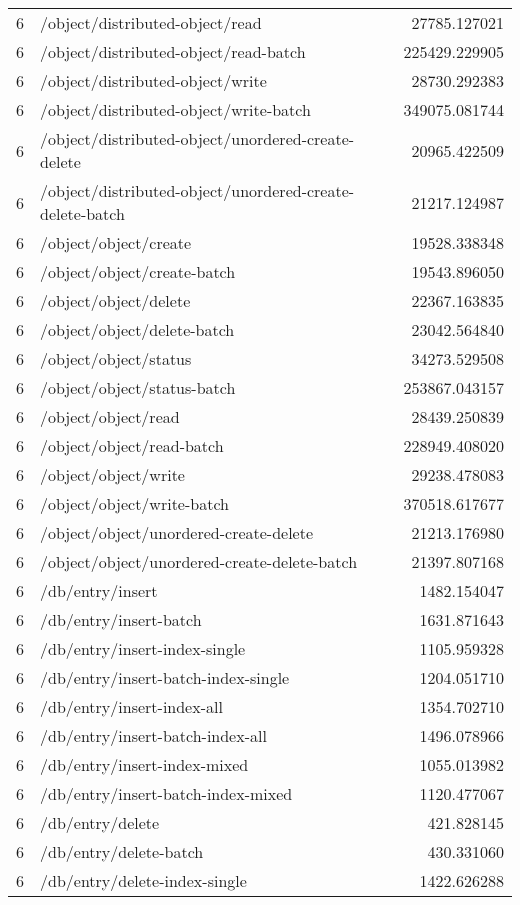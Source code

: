 \begin{longtable}{rlr}
6 & /object/distributed-object/read & 27785.127021 \\
6 & /object/distributed-object/read-batch & 225429.229905 \\
6 & /object/distributed-object/write & 28730.292383 \\
6 & /object/distributed-object/write-batch & 349075.081744 \\
6 & /object/distributed-object/unordered-create-delete & 20965.422509 \\
6 & /object/distributed-object/unordered-create-delete-batch & 21217.124987 \\
6 & /object/object/create & 19528.338348 \\
6 & /object/object/create-batch & 19543.896050 \\
6 & /object/object/delete & 22367.163835 \\
6 & /object/object/delete-batch & 23042.564840 \\
6 & /object/object/status & 34273.529508 \\
6 & /object/object/status-batch & 253867.043157 \\
6 & /object/object/read & 28439.250839 \\
6 & /object/object/read-batch & 228949.408020 \\
6 & /object/object/write & 29238.478083 \\
6 & /object/object/write-batch & 370518.617677 \\
6 & /object/object/unordered-create-delete & 21213.176980 \\
6 & /object/object/unordered-create-delete-batch & 21397.807168 \\
6 & /db/entry/insert & 1482.154047 \\
6 & /db/entry/insert-batch & 1631.871643 \\
6 & /db/entry/insert-index-single & 1105.959328 \\
6 & /db/entry/insert-batch-index-single & 1204.051710 \\
6 & /db/entry/insert-index-all & 1354.702710 \\
6 & /db/entry/insert-batch-index-all & 1496.078966 \\
6 & /db/entry/insert-index-mixed & 1055.013982 \\
6 & /db/entry/insert-batch-index-mixed & 1120.477067 \\
6 & /db/entry/delete & 421.828145 \\
6 & /db/entry/delete-batch & 430.331060 \\
6 & /db/entry/delete-index-single & 1422.626288 \\

\end{longtable}
